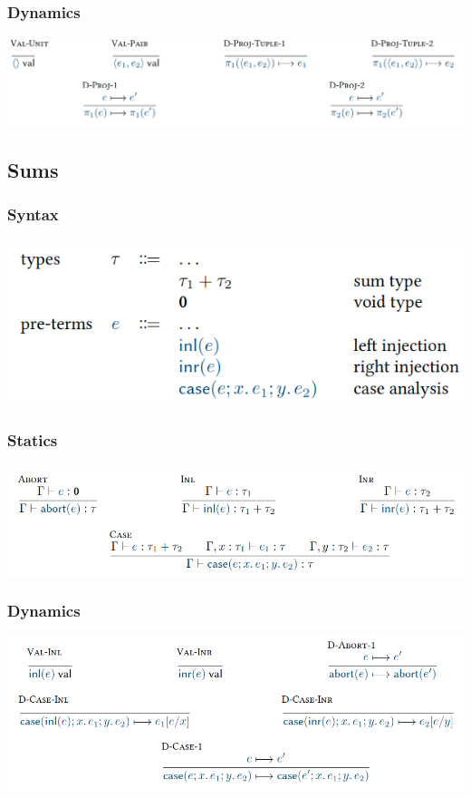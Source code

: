\documentclass[11pt,a4paper,titlepage,dvipsnames,cmyk]{scrartcl}
\begin{document}
\subsubsection{Dynamics}
\includegraphics[width=\textwidth]{pics/dynamic-stlc.png}

\subsection{Sums}
\subsubsection{Syntax}
\begin{center}
\includegraphics[width=\textwidth/2]{pics/syntax-stlc-sum.png}
\end{center}
\subsubsection{Statics}
\includegraphics[width=\textwidth]{pics/static-stlc-sum.png}
\subsubsection{Dynamics}
\includegraphics[width=\textwidth]{pics/dynamic-stlc-sum.png}
\end{document}

